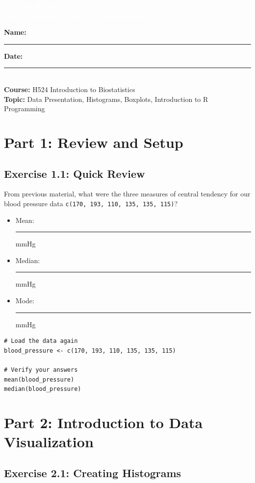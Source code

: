 \documentclass[11pt]{article}
\title{}
\author{}
\date{}
\begin{document}
\begin{tcolorbox}[colback=osaorange,colframe=black,boxrule=2pt,arc=0pt,left=6pt,right=6pt,top=10pt,bottom=10pt]
\centering
\textcolor{white}{\textbf{\Large In-Class Worksheet}}\\
\textcolor{white}{\textbf{\large Data Visualization and R Programming}}
\end{tcolorbox}

\vspace{8pt}

\noindent\textbf{Name:} \rule{8cm}{0.4pt} \hfill \textbf{Date:} \rule{4cm}{0.4pt}\\[0.5ex]
\textbf{Course:} H524 Introduction to Biostatistics\\
\textbf{Topic:} Data Presentation, Histograms, Boxplots, Introduction to R Programming

\vspace{8pt}

\section{Part 1: Review and Setup}

\subsection{Exercise 1.1: Quick Review}
From previous material, what were the three measures of central tendency for our blood pressure data \texttt{c(170, 193, 110, 135, 135, 115)}?

\begin{itemize}
\item Mean: \rule{2cm}{0.4pt} mmHg
\item Median: \rule{2cm}{0.4pt} mmHg
\item Mode: \rule{2cm}{0.4pt} mmHg
\end{itemize}

\begin{lstlisting}
# Load the data again
blood_pressure <- c(170, 193, 110, 135, 135, 115)

# Verify your answers
mean(blood_pressure)
median(blood_pressure)
\end{lstlisting}

\section{Part 2: Introduction to Data Visualization}

\subsection{Exercise 2.1: Creating Histograms}
\end{document}
